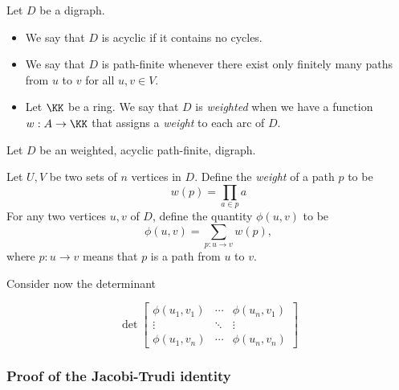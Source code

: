 \documentclass{article}
\begin{document}
\begin{definition}
    Let $D$ be a digraph.
    \begin{itemize}
        \item We say that $D$ is acyclic if it contains no cycles.
        \item We say that $D$ is path-finite whenever there exist only finitely many paths from $u$ to $v$ for all $u,v \in V$.
        \item Let $\KK$ be a ring. We say that $D$ is \textit{weighted} when we have a function $w: A \to \KK$ that assigns a \textit{weight} to each arc of $D$.
    \end{itemize}
\end{definition}

\begin{theorem} 
    Let $D$ be an weighted, acyclic path-finite, digraph.

    Let $U, V$ be two sets of $n$ vertices in $D$. Define the \textit{weight} of a path $p$ to be 
    \[
        w(p) = \prod_{a \in p} a
    \]
    For any two vertices $u, v$ of $D$, define the quantity $\phi(u, v)$ to be
    \[
        \phi(u,v) = \sum_{p:u \rightarrow v} w(p),
    \]
    where $p: u \rightarrow v$ means that $p$ is a path from $u$ to $v$.

    Consider now the determinant 

    \[
        \det \begin{bmatrix}
            \phi(u_1, v_1) & \cdots & \phi(u_n, v_1) \\
             \vdots & \ddots & \vdots \\
            \phi(u_1, v_n) & \cdots & \phi(u_n, v_n)
        \end{bmatrix}
    \]

\end{theorem}

\subsubsection{Proof of the Jacobi-Trudi identity}
\end{document}
